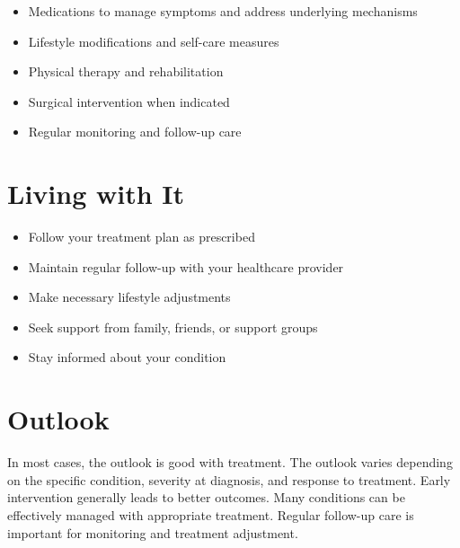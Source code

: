 \begin{itemize}[noitemsep]
  \item Medications to manage symptoms and address underlying mechanisms
  \item Lifestyle modifications and self-care measures
  \item Physical therapy and rehabilitation
  \item Surgical intervention when indicated
  \item Regular monitoring and follow-up care
\end{itemize}
\section{Living with It}
\begin{itemize}[noitemsep]
  \item Follow your treatment plan as prescribed
  \item Maintain regular follow-up with your healthcare provider
  \item Make necessary lifestyle adjustments
  \item Seek support from family, friends, or support groups
  \item Stay informed about your condition
\end{itemize}
\section{Outlook}
In most cases, the outlook is good with treatment. The outlook varies depending on the specific condition, severity at diagnosis, and response to treatment. Early intervention generally leads to better outcomes. Many conditions can be effectively managed with appropriate treatment. Regular follow-up care is important for monitoring and treatment adjustment.
